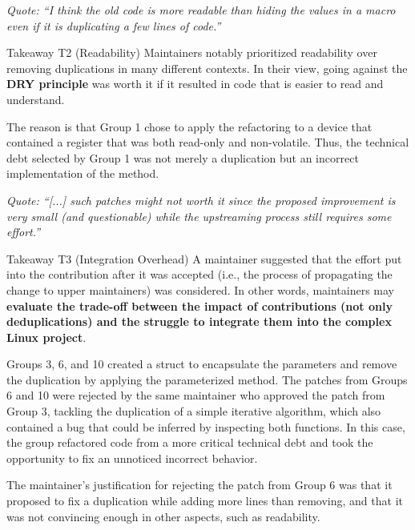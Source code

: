 \documentclass[sigconf]{acmart}
\newenvironment{highlight-box}[1]{%
  \begin{framed}%
  \noindent\textbf{#1:} \itshape\ignorespaces}{%
  \end{framed}}
\begin{document}
\noindent
\begin{footnotesize}
\textit{
  Quote: ``I think the old code is more readable than hiding the values in a macro
  even if it is duplicating a few lines of code.''
}
\end{footnotesize}

\begin{highlight-box}{Takeaway T2 (Readability)}
  Maintainers notably prioritized readability over removing duplications in
  many different contexts. In their view, going against the \textbf{DRY
  principle} was worth it if it resulted in code that is easier to read and
  understand.
\end{highlight-box}

The reason is that Group 1 chose to apply the refactoring to a device that contained a register that was both read-only and non-volatile. Thus, the technical debt selected by Group 1 was not merely a duplication but an incorrect implementation of the method.

\noindent
\begin{footnotesize}
\textit{
  Quote: ``[...] such patches might not worth it since the proposed
  improvement is very small (and questionable) while the upstreaming process
  still requires some effort.''
}
\end{footnotesize}

\begin{highlight-box}{Takeaway T3 (Integration Overhead)}
  A maintainer suggested that the effort put into the contribution after it was
  accepted (i.e., the process of propagating the change to upper maintainers)
  was considered. In other words, maintainers may \textbf{evaluate the
  trade-off between the impact of contributions (not only deduplications) and
  the struggle to integrate them into the complex Linux project}.
\end{highlight-box}



Groups 3, 6, and 10 created a struct to encapsulate the parameters and remove the duplication by applying the parameterized method. The patches from Groups 6 and 10 were rejected by the same maintainer who approved the patch from Group 3, tackling the duplication of a simple iterative algorithm, which also contained a bug that could be inferred by inspecting both functions. In this case, the group refactored code from a more critical technical debt and took the opportunity to fix an unnoticed incorrect behavior.

The maintainer's justification for rejecting the patch from Group 6 was that it proposed to fix a duplication while adding more lines than removing, and that it was not convincing enough in other aspects, such as readability.
\end{document}
